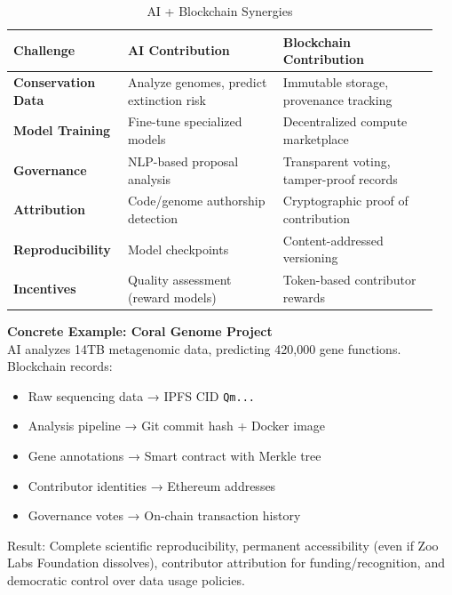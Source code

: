 \begin{table}[t]
\centering
\caption{AI + Blockchain Synergies}
\label{tab:synergies}
\begin{tabular}{@{}p{0.25\linewidth}p{0.35\linewidth}p{0.35\linewidth}@{}}
\toprule
\textbf{Challenge} & \textbf{AI Contribution} & \textbf{Blockchain Contribution} \\ \midrule
\textbf{Conservation Data} & Analyze genomes, predict extinction risk & Immutable storage, provenance tracking \\
\textbf{Model Training} & Fine-tune specialized models & Decentralized compute marketplace \\
\textbf{Governance} & NLP-based proposal analysis & Transparent voting, tamper-proof records \\
\textbf{Attribution} & Code/genome authorship detection & Cryptographic proof of contribution \\
\textbf{Reproducibility} & Model checkpoints & Content-addressed versioning \\
\textbf{Incentives} & Quality assessment (reward models) & Token-based contributor rewards \\
\bottomrule
\end{tabular}
\end{table}

\textbf{Concrete Example: Coral Genome Project} \\
AI analyzes 14TB metagenomic data, predicting 420,000 gene functions. Blockchain records:
\begin{itemize}
    \item Raw sequencing data → IPFS CID \texttt{Qm...}
    \item Analysis pipeline → Git commit hash + Docker image
    \item Gene annotations → Smart contract with Merkle tree
    \item Contributor identities → Ethereum addresses
    \item Governance votes → On-chain transaction history
\end{itemize}

Result: Complete scientific reproducibility, permanent accessibility (even if Zoo Labs Foundation dissolves), contributor attribution for funding/recognition, and democratic control over data usage policies.

